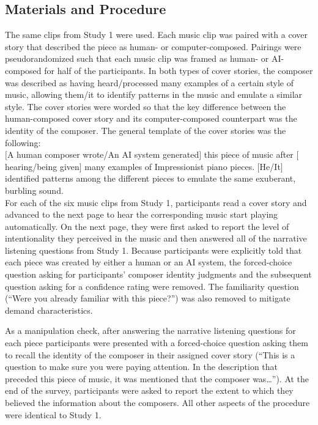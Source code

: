 \documentclass[12pt,twoside]{reedthesis}
\begin{document}
\subsection*{Materials and Procedure}

The same clips from Study 1 were used. Each music clip was paired with a cover story that described the piece as human- or computer-composed. Pairings were pseudorandomized such that each music clip was framed as human- or AI-composed for half of the participants. In both types of cover stories, the composer was described as having heard/processed many examples of a certain style of music, allowing them/it to identify patterns in the music and emulate a similar style. The cover stories were worded so that the key difference between the human-composed cover story and its computer-composed counterpart was the identity of the composer. The general template of the cover stories was the following:
\\

$[$A human composer wrote/An AI system generated$]$ this piece of music after $[$hearing/being given$]$ many examples of Impressionist piano pieces. $[$He/It$]$ identified patterns among the different pieces to emulate the same exuberant, burbling sound.
\\

For each of the six music clips from Study 1, participants read a cover story and advanced to the next page to hear the corresponding music start playing automatically. On the next page, they were first asked to report the level of intentionality they perceived in the music and then answered all of the narrative listening questions from Study 1. Because participants were explicitly told that each piece was created by either a human or an AI system, the forced-choice question asking for participants’ composer identity judgments and the subsequent question asking for a confidence rating were removed. The familiarity question (“Were you already familiar with this piece?”) was also removed to mitigate demand characteristics. 

As a manipulation check, after answering the narrative listening questions for each piece participants were presented with a forced-choice question asking them to recall the identity of the composer in their assigned cover story (“This is a question to make sure you were paying attention. In the description that preceded this piece of music, it was mentioned that the composer was…”). At the end of the survey, participants were asked to report the extent to which they believed the information about the composers. All other aspects of the procedure were identical to Study 1.
\end{document}
